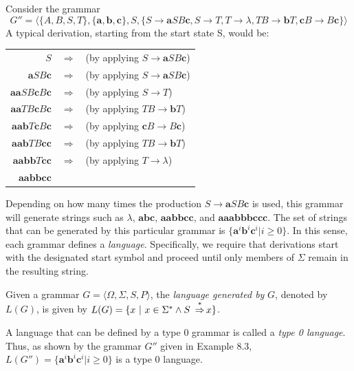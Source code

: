 Consider the grammar
\[ G'' = \langle\{A,B,S,T\},\{\pmb{a},\pmb{b},\pmb{c}\},S,\{S\rightarrow\pmb{a}
	SB\pmb{c},S\rightarrow T,T\rightarrow\lambda,TB\rightarrow\pmb{b}T,
	\pmb{c}B\rightarrow B\pmb{c}\}\rangle \]
A typical derivation, starting from the start state S, would be:
\begin{center}\begin{tabular}{r@{ }c@{ }l}
$S$ & $\Rightarrow$ & (by applying $S \rightarrow \pmb{a}SB\pmb{c}$) \\
$\pmb{a}SB\pmb{c}$ & $\Rightarrow$ & (by applying $S \rightarrow \pmb{a}SB\pmb{c}$) \\
$\pmb{aa}SB\pmb{c}B\pmb{c}$ & $\Rightarrow$ & (by applying $S \rightarrow T$) \\
$\pmb{aa}TB\pmb{c}B\pmb{c}$ & $\Rightarrow$ & (by applying $TB \rightarrow \pmb{b}T$) \\
$\pmb{aab}T\pmb{c}B\pmb{c}$ & $\Rightarrow$ & (by applying $\pmb{c}B \rightarrow B\pmb{c}$) \\
$\pmb{aab}TB\pmb{cc}$ & $\Rightarrow$ & (by applying $TB \rightarrow \pmb{b}T$) \\
$\pmb{aabb}T\pmb{cc}$ & $\Rightarrow$ & (by applying $T \rightarrow \lambda$) \\\
$\pmb{aabbcc}$
\end{tabular}\end{center}
Depending on how many times the production $S \rightarrow \pmb{a}SB\pmb{c}$ is
used, this grammar will generate strings such as $\lambda$, $\pmb{abc}$,
$\pmb{aabbcc}$, and $\pmb{aaabbbccc}$. The set of strings that can be generated
by this particular grammar is $\{\pmb{a}^i\pmb{b}^i\pmb{c}^i| i \geq 0\}$. In
this sense, each grammar defines a \emph{language}. Specifically, we require
that derivations start with the designated start symbol and proceed until only
members of $\Sigma$ remain in the resulting string.

\begin{dfn}\label{dfn-8.2}
Given a grammar $G = \langle\Omega,\Sigma,S,P\rangle$, the \emph{language
generated by} $G$, denoted by $L(G)$, is given by $L(G)=\{x\ |\ x \in \Sigma^* 
\wedge S\ \operatorname{\overset{*}{\Rightarrow}} x\}$.
\end{dfn}

A language that can be defined by a type 0 grammar is called a \emph{type 0
language}. Thus, as shown by the grammar $G''$ given in Example 8.3, $L(G'')
=\{\pmb{a}^i\pmb{b}^i\pmb{c}^i|i \geq 0\}$ is a type 0 language.

